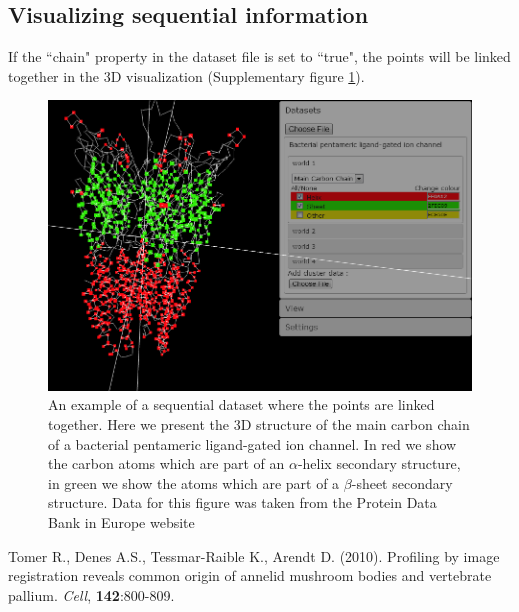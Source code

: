 \documentclass{bioinfo}
\begin{document}
\subsection{Visualizing sequential information}
If the ``chain" property in the dataset file is set to ``true", the points will be linked together in the 3D visualization (Supplementary figure \ref{fig:02}).
\begin{figure}[h!]%
\centerline{\includegraphics[totalheight=0.2\textheight]{Supp_fig2.png}}
\caption{An example of a sequential dataset where the points are linked together. Here we present the 3D structure of the main carbon chain of a bacterial pentameric ligand-gated ion channel. In red we show the carbon atoms which are part of an $\alpha$-helix secondary structure, in green we show the atoms which are part of a $\beta$-sheet secondary structure. Data for this figure was taken from the Protein Data Bank in Europe website}\label{fig:02}
\end{figure}
\begin{thebibliography}{}
 Tomer R., Denes A.S., Tessmar-Raible K., Arendt D. (2010). Profiling by image registration reveals common origin of annelid mushroom bodies and vertebrate pallium. {\it{Cell}}, {\bf{142}}:800-809. 
\end{thebibliography}
\end{document}
